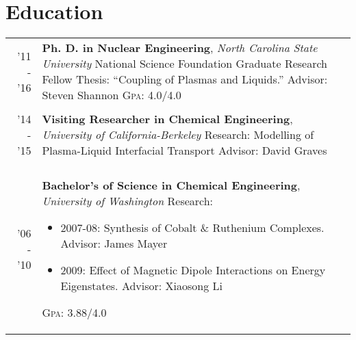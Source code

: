 \documentclass[a4paper,10pt]{article} %
\begin{document}
\section{Education}

\begin{table}[H]
\begin{tabularx}{\textwidth}{r>{\raggedright\arraybackslash}X}

  \textsc{'11 - '16} & \textbf{Ph. D. in Nuclear Engineering}, \textit{North Carolina State University}\newline
  National Science Foundation Graduate Research Fellow\newline
  Thesis: ``Coupling of Plasmas and Liquids.''\newline
  Advisor: Steven Shannon\newline
  \textsc{Gpa}: 4.0/4.0\\
&\\


  \textsc{'14 - '15} & \textbf{Visiting Researcher in Chemical Engineering}, \textit{University of California-Berkeley}\newline
  Research: Modelling of Plasma-Liquid Interfacial Transport\newline
  Advisor: David Graves\\
&\\


  \textsc{'06 - '10} & \textbf{Bachelor's of Science in Chemical Engineering}, \textit{University of Washington}\newline
  Research:
  \begin{itemize}
  \item 2007-08: Synthesis of Cobalt \& Ruthenium Complexes. Advisor: James Mayer
  \item 2009: Effect of Magnetic Dipole Interactions on Energy Eigenstates. Advisor: Xiaosong Li
  \end{itemize}
  \textsc{Gpa}: 3.88/4.0\\

\end{tabularx}
\end{table}

\pagebreak
\end{document}
